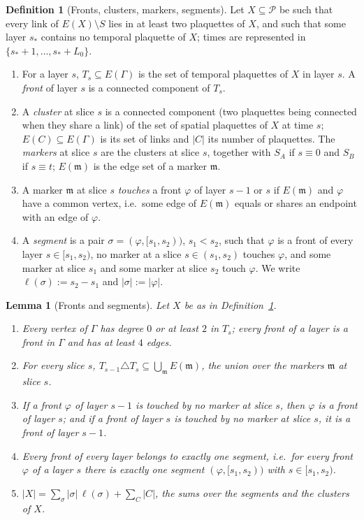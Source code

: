 \documentclass[11pt,a4paper]{article}
\newtheorem{lemma}[theorem]{Lemma}
\theoremstyle{definition}
\newtheorem{definition}[theorem]{Definition}
\theoremstyle{remark}
\newcommand{\cP}{\mathcal{P}}
\begin{document}
\begin{definition}[Fronts, clusters, markers, segments]\label{mg:def:fronts}
Let $X\subseteq\cP$ be such that every link of $E(X)\setminus S$ lies in at least two plaquettes of $X$, and such that some layer $s_*$ contains
no temporal plaquette of $X$; times are represented in $\{s_*+1,\dots,s_*+L_0\}$.
\begin{enumerate}[label=(\alph*)]
\item For a layer $s$, $T_s\subseteq E(\Gamma)$ is the set of temporal plaquettes of $X$ in layer $s$. A \emph{front} of layer $s$ is a connected
component of $T_s$.
\item A \emph{cluster} at slice $s$ is a connected component (two plaquettes being connected when they share a link) of the set of spatial
plaquettes of $X$ at time $s$; $E(C)\subseteq E(\Gamma)$ is its set of links and $|C|$ its number of plaquettes. The \emph{markers} at slice
$s$ are the clusters at slice $s$, together with $S_A$ if $s\equiv0$ and $S_B$ if $s\equiv t$; $E(\mathfrak m)$ is the edge set of a marker
$\mathfrak m$.
\item A marker $\mathfrak m$ at slice $s$ \emph{touches} a front $\varphi$ of layer $s-1$ or $s$ if $E(\mathfrak m)$ and $\varphi$ have a common
vertex, i.e.\ some edge of $E(\mathfrak m)$ equals or shares an endpoint with an edge of $\varphi$.
\item A \emph{segment} is a pair $\sigma=(\varphi,[s_1,s_2))$, $s_1<s_2$, such that $\varphi$ is a front of every layer $s\in[s_1,s_2)$, no marker at a
slice $s\in(s_1,s_2)$ touches $\varphi$, and some marker at slice $s_1$ and some marker at slice $s_2$ touch $\varphi$. We write $\ell(\sigma):=s_2-s_1$
and $|\sigma|:=|\varphi|$.
\end{enumerate}
\end{definition}

\begin{lemma}[Fronts and segments]\label{mg:lem:fronts}
Let $X$ be as in Definition~\ref{mg:def:fronts}.
\begin{enumerate}[label=(\roman*)]
\item Every vertex of $\Gamma$ has degree $0$ or at least $2$ in $T_s$; every front of a layer is a front in $\Gamma$ and has at least $4$ edges.
\item For every slice $s$, $T_{s-1}\triangle T_s\subseteq\bigcup_{\mathfrak m}E(\mathfrak m)$, the union over the markers $\mathfrak m$ at slice $s$.
\item If a front $\varphi$ of layer $s-1$ is touched by no marker at slice $s$, then $\varphi$ is a front of layer $s$; and if a front of layer $s$ is
touched by no marker at slice $s$, it is a front of layer $s-1$.
\item Every front of every layer belongs to exactly one segment, i.e.\ for every front $\varphi$ of a layer $s$ there is exactly one segment
$(\varphi,[s_1,s_2))$ with $s\in[s_1,s_2)$.
\item $|X|=\sum_\sigma|\sigma|\,\ell(\sigma)+\sum_C|C|$, the sums over the segments and the clusters of $X$.
\end{enumerate}
\end{lemma}
\end{document}
